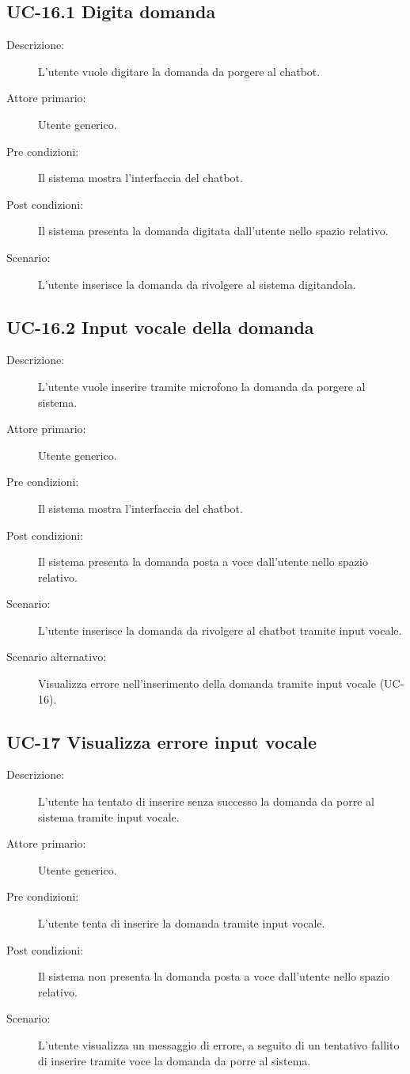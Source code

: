 \subsection{UC-16.1 Digita domanda}
\begin{description}
    \item[Descrizione:] L'utente vuole digitare la domanda da porgere al chatbot.
    \item[Attore primario:] Utente generico.
    \item[Pre condizioni:] Il sistema mostra l'interfaccia del chatbot.
    \item[Post condizioni:] Il sistema presenta la domanda digitata dall'utente nello spazio relativo.
    \item[Scenario:] L'utente inserisce la domanda da rivolgere al sistema digitandola.
\end{description}

\subsection{UC-16.2 Input vocale della domanda}
\begin{description}
    \item[Descrizione:] L'utente vuole inserire tramite microfono la domanda da porgere al sistema.
    \item[Attore primario:] Utente generico.
    \item[Pre condizioni:] Il sistema mostra l'interfaccia del chatbot.
    \item[Post condizioni:] Il sistema presenta la domanda posta a voce dall'utente nello spazio relativo.
    \item[Scenario:] L'utente inserisce la domanda da rivolgere al chatbot tramite input vocale.
    \item[Scenario alternativo:] Visualizza errore nell'inserimento della domanda tramite input vocale (UC-16).
\end{description}

\subsection{UC-17 Visualizza errore input vocale}
\begin{description}
    \item[Descrizione:] L'utente ha tentato di inserire senza successo la domanda da porre al sistema tramite input vocale.
    \item[Attore primario:] Utente generico.
    \item[Pre condizioni:] L'utente tenta di inserire la domanda tramite input vocale.
    \item[Post condizioni:] Il sistema non presenta la domanda posta a voce dall'utente nello spazio relativo.
    \item[Scenario:] L'utente visualizza un messaggio di errore, a seguito di un tentativo fallito di inserire tramite voce la domanda da porre al sistema.
\end{description}

